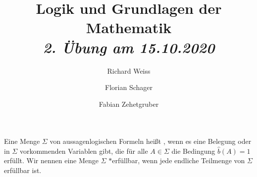 \documentclass{article}
\title
{
  Logik und Grundlagen der Mathematik \\
  \vspace{4pt}
  \normalsize
  \textit{2. Übung am 15.10.2020}
}
\author
{
  Richard Weiss
  \and
  Florian Schager
  \and
  Fabian Zehetgruber
}
\date{}
\begin{document}
\maketitle

Eine Menge $\Sigma$ von aussagenlogischen Formeln heißt , wenn es eine Belegung oder in $\Sigma$ vorkommenden Variablen gibt, die für alle $A \in \Sigma$ die Bedingung $\hat{b}(A) = 1$ erfüllt.
Wir nennen eine Menge $\Sigma$ $\ast$erfüllbar, wenn jede endliche Teilmenge von $\Sigma$ erfüllbar ist.














\end{document}
